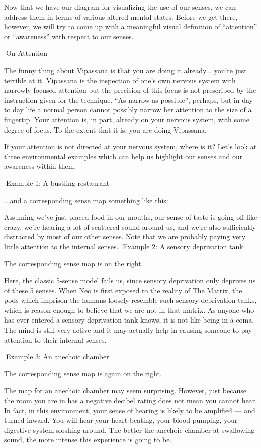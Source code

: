 \documentclass{article}
\begin{document}
Now that we have our diagram for visualizing the use of our senses, we can address them in terms of various altered mental states. Before we get there, however, we will try to come up with a meaningful visual definition of “attention” or “awareness” with respect to our senses.

On Attention

The funny thing about Vipassana is that you are doing it already... you're just terrible at it. Vipassana is the inspection of one's own nervous system with narrowly-focused attention but the precision of this focus is not prescribed by the instruction given for the technique. “As narrow as possible”, perhaps, but in day to day life a normal person cannot possibly narrow her attention to the size of a fingertip. Your attention is, in part, already on your nervous system, with some degree of focus. To the extent that it is, you are doing Vipassana.

If your attention is not directed at your nervous system, where is it? Let's look at three environmental examples which can help us highlight our senses and our awareness within them.

Example 1:
A bustling restaurant

...and a corresponding sense map something like this:

Assuming we've just placed food in our mouths, our sense of taste is going off like crazy, we're hearing a lot of scattered sound around us, and we're also sufficiently distracted by most of our other senses. Note that we are probably paying very little attention to the internal senses.
Example 2:
A sensory deprivation tank

The corresponding sense map is on the right.

Here, the classic 5-sense model fails us, since sensory deprivation only deprives us of these 5 senses. When Neo is first exposed to the reality of The Matrix, the pods which imprison the humans loosely resemble such sensory deprivation tanks, which is reason enough to believe that we are not in that matrix. As anyone who has ever entered a sensory deprivation tank knows, it is not like being in a coma. The mind is still very active and it may actually help in causing someone to pay attention to their internal senses.

Example 3:
An anechoic chamber

The corresponding sense map is again on the right.

The map for an anechoic chamber may seem surprising. However, just because the room you are in has a negative decibel rating does not mean you cannot hear. In fact, in this environment, your sense of hearing is likely to be amplified — and turned inward. You will hear your heart beating, your blood pumping, your digestive system sloshing around. The better the anechoic chamber at swallowing sound, the more intense this experience is going to be.
\end{document}
